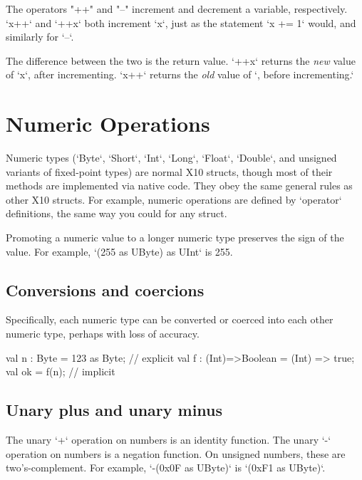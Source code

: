 The operators \xcd"++" and \xcd"--" increment and decrement
a variable, respectively.  
\xcd`x++` and \xcd`++x` both increment \xcd`x`, just as the statement 
\xcd`x += 1` would, and similarly for \xcd`--`.  

The difference between the two is the return value.  
\xcd`++x` returns the {\em new} value of \xcd`x`, after incrementing.
\xcd`x++` returns the {\em old} value of \xcd`, before incrementing.`


\section{Numeric Operations}
\label{XtenPromotions}

Numeric types (\xcd`Byte`, \xcd`Short`, \xcd`Int`, \xcd`Long`, \xcd`Float`,
\xcd`Double`, and unsigned variants of fixed-point types) are normal X10
structs, though most of their methods are implemented via native code. They
obey the same general rules as other X10 structs. For example, numeric
operations are defined by \xcd`operator` definitions, the same way you could
for any struct.

Promoting a numeric value to a longer numeric type preserves the sign of the
value.  For example, \xcd`(255 as UByte) as UInt` is 255.  

\subsection{Conversions and coercions}

Specifically, each numeric type can be converted or coerced into each other
numeric type, perhaps with loss of accuracy.
\begin{xten}
val n : Byte = 123 as Byte; // explicit 
val f : (Int)=>Boolean = (Int) => true; 
val ok = f(n); // implicit
\end{xten}



\subsection{Unary plus and unary minus}

The unary \xcd`+` operation on numbers is an identity function.
The unary \xcd`-` operation on numbers is a negation function.
On unsigned numbers, these are two's-complement.  For example, 
\xcd`-(0x0F as UByte)` is 
\xcd`(0xF1 as UByte)`.



